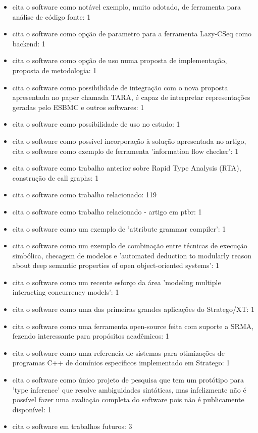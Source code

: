 \begin{itemize}
\item cita o software como notável exemplo, muito adotado, de ferramenta para análise de código fonte: 1
\item cita o software como opção de parametro para a ferramenta Lazy-CSeq como backend: 1
\item cita o software como opção de uso numa proposta de implementação, proposta de metodologia: 1
\item cita o software como possibilidade de integração com o nova proposta apresentada no paper chamada TARA, é capaz de interpretar representações geradas pelo ESBMC e outros softwares: 1
\item cita o software como possibilidade de uso no estudo: 1
\item cita o software como possível incorporação à solução apresentada no artigo, cita o software como exemplo de ferramenta 'information flow checker': 1
\item cita o software como trabalho anterior sobre Rapid Type Analysis (RTA), construção de call graphs: 1
\item cita o software como trabalho relacionado: 119
\item cita o software como trabalho relacionado - artigo em ptbr: 1
\item cita o software como um exemplo de 'attribute grammar compiler': 1
\item cita o software como um exemplo de combinação entre técnicas de execução simbólica, checagem de modelos e 'automated deduction to modularly reason about deep semantic properties of open object-oriented systems': 1
\item cita o software como um recente esforço da área 'modeling multiple interacting concurrency models': 1
\item cita o software como uma das primeiras grandes aplicações do Stratego/XT: 1
\item cita o software como uma ferramenta open-source feita com suporte a SRMA, fezendo interessante para propósitos acadêmicos: 1
\item cita o software como uma referencia de sistemas para otimizações de programas C++ de domínios específicos implementado em Stratego: 1
\item cita o software como único projeto de pesquisa que tem um protótipo para 'type inference' que resolve ambiguidades sintáticas, mas infelizmente não é possível fazer uma avaliação completa do software pois não é publicamente disponível: 1
\item cita o software em trabalhos futuros: 3

\end{itemize}
